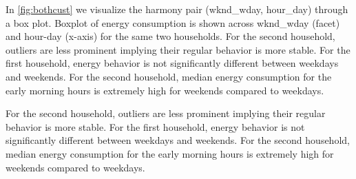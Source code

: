 \documentclass[12pt]{article}
\begin{document}
In \autoref{fig:bothcust} we visualize the harmony pair (wknd\_wday,
hour\_day) through a box plot. Boxplot of energy consumption is shown
across wknd\_wday (facet) and hour-day (x-axis) for the same two
households. For the second household, outliers are less prominent
implying their regular behavior is more stable. For the first household,
energy behavior is not significantly different between weekdays and
weekends. For the second household, median energy consumption for the
early morning hours is extremely high for weekends compared to weekdays.

For the second household, outliers are less prominent implying their
regular behavior is more stable. For the first household, energy
behavior is not significantly different between weekdays and weekends.
For the second household, median energy consumption for the early
morning hours is extremely high for weekends compared to weekdays.
\end{document}

